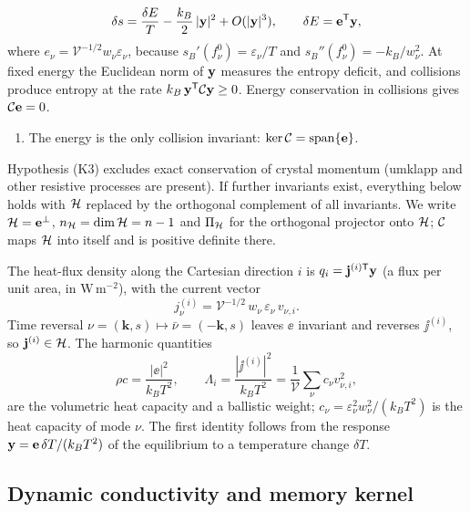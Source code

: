 \begin{equation}
\delta s=\frac{\delta E}{T}-\frac{k_B}{2}\,|\mathbf y|^2+O(|\mathbf y|^3),\qquad \delta E=\mathbf e^{\mathsf T}\mathbf y,
\label{eq:entropy}
\end{equation}
where $e_\nu=\mathcal V^{-1/2}w_\nu\varepsilon_\nu$, because $s_B'(f^0_\nu)=\varepsilon_\nu/T$ and
$s_B''(f^0_\nu)=-k_B/w_\nu^2$. At fixed energy the Euclidean norm of $\mathbf y$ measures the entropy deficit,
and collisions produce entropy at the rate $k_B\,\mathbf y^{\mathsf T}\mathcal C\mathbf y\ge0$. Energy conservation in collisions
gives $\mathcal C\mathbf e=0$.
\begin{enumerate}
\item[(K3)] The energy is the only collision invariant: $\ker\mathcal C=\mathrm{span}\{\mathbf e\}$.
\end{enumerate}
Hypothesis (K3) excludes exact conservation of crystal momentum (umklapp and other resistive processes
are present). If further invariants exist, everything below holds with $\mathcal H$ replaced by the
orthogonal complement of all invariants. We write $\mathcal H=\mathbf e^\perp$, $n_{\mathcal H}=\dim\mathcal H=n-1$ and
$\Pi_{\mathcal H}$ for the orthogonal projector onto $\mathcal H$; $\mathcal C$ maps $\mathcal H$ into itself and is positive
definite there.

The heat-flux density along the Cartesian direction $i$ is $q_i=\mathbf j^{(i)\mathsf T}\mathbf y$ (a flux per unit
area, in $\mathrm{W\,m^{-2}}$), with the current vector
\begin{equation}
j^{(i)}_\nu=\mathcal V^{-1/2}\,w_\nu\,\varepsilon_\nu\,v_{\nu,i}.
\label{eq:current}
\end{equation}
Time reversal $\nu=(\mathbf k,s)\mapsto\bar\nu=(-\mathbf k,s)$ leaves $\ee$ invariant and reverses
$\jj^{(i)}$, so $\mathbf j^{(i)}\in\mathcal H$. The harmonic quantities
\begin{equation}
\rho c=\frac{|\ee|^2}{k_BT^2},\qquad
\Lambda_i=\frac{|\jj^{(i)}|^2}{k_BT^2}=\frac1{\mathcal V}\sum_\nu c_\nu v_{\nu,i}^2,
\label{eq:harmonic}
\end{equation}
are the volumetric heat capacity and a ballistic weight; $c_\nu=\varepsilon_\nu^2w_\nu^2/(k_BT^2)$ is the
heat capacity of mode $\nu$. The first identity follows from the response $\mathbf y=\mathbf e\,\delta T/(k_BT^2)$
of the equilibrium to a temperature change $\delta T$.

\subsection{Dynamic conductivity and memory kernel}\label{sec:response}

